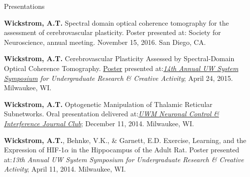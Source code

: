 \documentclass[10pt, oneside]{article}
\begin{document}
\begin{cvlist}{Presentations}%
	\item \textbf{Wickstrom, A.T.} Spectral domain optical coherence tomography for the assessment of cerebrovascular plasticity.  Poster presented at: Society for Neuroscience, annual meeting. November 15, 2016. San Diego, CA.
	\item \textbf{Wickstrom, A.T.} Cerebrovascular Plasticity Assessed by Spectral-Domain Optical \newline Coherence Tomography.
		\color{blue}\href {https://sites.google.com/site/atwreferencesapril2015/}{Poster} \color{black}presented at:\hspace{2pt}\color{blue}\href{http://dc.uwm.edu/uwsurca/2015/Poster1/55/}{\textit{14th Annual UW System Symposium}}\newline
		\color{black}\textit{for Undergraduate Research \& Creative Activity}; April 24, 2015. Milwaukee, WI.
	\color{blue}
	
	\color{black}
	\item \textbf{Wickstrom, A.T.} Optogenetic Manipulation of Thalamic Reticular Subnetworks. \newline Oral presentation delivered at:\hspace{2pt}\color{blue}\href{https://sites.google.com/site/uwmnci/}			{\textit{UWM Neuronal Control \& Interference Journal Club}}\color{black}; December 11, 2014. Milwaukee, WI.
	\item \textbf{Wickstrom, A.T.}, Behnke, V.K., \& Garnett, E.D. Exercise, Learning, and the Expression of HIF-1$\alpha$ in the
		Hippocampus of the Adult Rat. 
		Poster presented at:\hspace{3pt}\textit{13th Annual UW System Symposium for Undergraduate Research \& Creative Activity}; 
		April 11, 2014. Milwaukee, WI.
	
\end{cvlist}
\vspace{-3mm}

\end{document}
